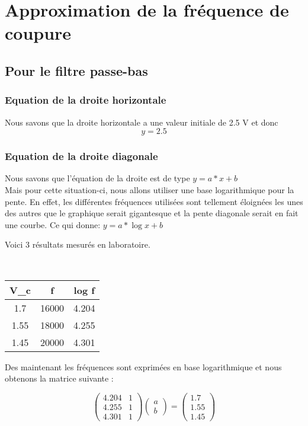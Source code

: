 \documentclass{article}
\begin{document}
 
\section{Approximation de la fréquence de coupure}

\subsection{Pour le filtre passe-bas}

\subsubsection{Equation de la droite horizontale} %
Nous savons que la droite horizontale a une valeur initiale de 2.5 V et donc \[y=2.5\]

\subsubsection{Equation de la droite diagonale}

Nous savons que l'équation de la droite est de type $y=a*x+b$
\\
Mais pour cette situation-ci, nous allons utiliser une base logarithmique pour la pente.  En effet, les différentes fréquences utilisées sont tellement éloignées les unes des autres que le graphique serait gigantesque et la pente diagonale serait en fait une courbe.  Ce qui donne: $y=a*\log{x}+b$

Voici 3 résultats mesurés en laboratoire.

\bigbreak
\\
\begin{tabular}{|c|c|c|}
\hline
V_c & f & log{ f} \\
\hline
1.7 & 16000 & 4.204\\
\hline
1.55 & 18000 & 4.255\\
\hline
1.45 & 20000 & 4.301 \\
\hline
\end{tabular}

\bigbreak
Des maintenant les fréquences sont exprimées en base logarithmique et nous obtenons la matrice suivante :
\bigbreak

$$
\begin{pmatrix}  
 4.204 & 1\\
 4.255 & 1 \\
 4.301 & 1 
\end{pmatrix}
\begin{pmatrix}  
a\\
b
\end{pmatrix}
=
\begin{pmatrix}  
1.7\\
1.55\\
1.45
\end{pmatrix}
$$
\end{document}
